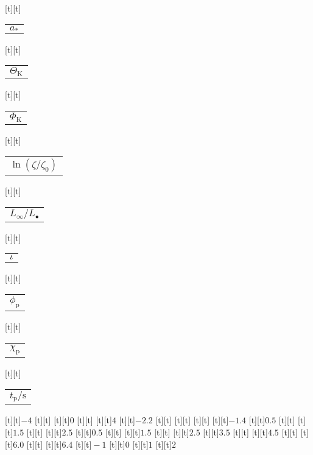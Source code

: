 \begin{psfrags}
[t][t]{\color[rgb]{0,0,0}\setlength{\tabcolsep}{0pt}\begin{tabular}{c}{$a_\ast$}\end{tabular}}%
[t][t]{\color[rgb]{0,0,0}\setlength{\tabcolsep}{0pt}\begin{tabular}{c}{$\Theta_\mathrm{K}$}\end{tabular}}%
[t][t]{\color[rgb]{0,0,0}\setlength{\tabcolsep}{0pt}\begin{tabular}{c}{$\Phi_\mathrm{K}$}\end{tabular}}%
[t][t]{\color[rgb]{0,0,0}\setlength{\tabcolsep}{0pt}\begin{tabular}{c}{$\ln(\zeta/\zeta_0)$}\end{tabular}}%
[t][t]{\color[rgb]{0,0,0}\setlength{\tabcolsep}{0pt}\begin{tabular}{c}{$L_\infty/L_\bullet$}\end{tabular}}%
[t][t]{\color[rgb]{0,0,0}\setlength{\tabcolsep}{0pt}\begin{tabular}{c}{$\iota$}\end{tabular}}%
[t][t]{\color[rgb]{0,0,0}\setlength{\tabcolsep}{0pt}\begin{tabular}{c}{$\phi_\mathrm{p}$}\end{tabular}}%
[t][t]{\color[rgb]{0,0,0}\setlength{\tabcolsep}{0pt}\begin{tabular}{c}{$\chi_\mathrm{p}$}\end{tabular}}%
[t][t]{\color[rgb]{0,0,0}\setlength{\tabcolsep}{0pt}\begin{tabular}{c}{$t_\mathrm{p}/\mathrm{s}$}\end{tabular}}%
%
[t][t]{$-4$}%
[t][t]{}%
[t][t]{$0$}%
[t][t]{}%
[t][t]{$4$}%
[t][t]{$-2.2$}%
[t][t]{}%
[t][t]{}%
[t][t]{}%
[t][t]{$-1.4$}%
[t][t]{$0.5$}%
[t][t]{}%
[t][t]{$1.5$}%
[t][t]{}%
[t][t]{$2.5$}%
[t][t]{$0.5$}%
[t][t]{}%
[t][t]{$1.5$}%
[t][t]{}%
[t][t]{$2.5$}%
[t][t]{$3.5$}%
[t][t]{}%
[t][t]{$4.5$}%
[t][t]{}%
[t][t]{$6.0$}%
[t][t]{}%
[t][t]{$6.4$}%
[t][t]{$\!-1$}%
[t][t]{$0$}%
[t][t]{$1$}%
[t][t]{$2$}%

\end{psfrags}
